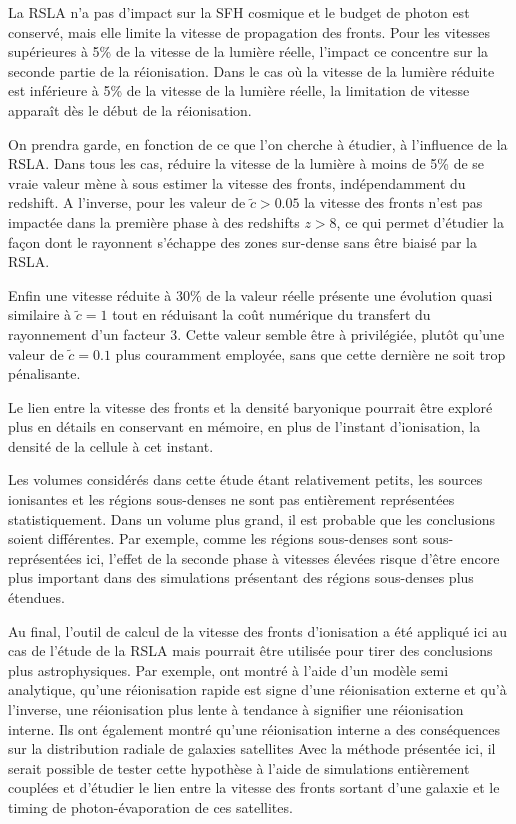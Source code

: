 La \ac{RSLA} n'a pas d'impact sur la \ac{SFH} cosmique et le budget de photon est conservé, mais elle limite la vitesse de propagation des fronts.
Pour les vitesses supérieures à 5\% de la vitesse de la lumière réelle, l'impact ce concentre sur la seconde partie de la réionisation.
Dans le cas où la vitesse de la lumière réduite est inférieure à 5\% de la vitesse de la lumière réelle, la limitation de vitesse apparaît dès le début de la réionisation. %

On prendra garde, en fonction de ce que l'on cherche à étudier, à l'influence de la \ac{RSLA}.
Dans tous les cas, réduire la vitesse de la lumière à moins de 5\% de se vraie valeur mène à sous estimer la vitesse des fronts, indépendamment du redshift.
A l'inverse, pour les valeur de $\tilde{c} > 0.05$ la vitesse des fronts n'est pas impactée dans la première phase à des redshifts $z>8$, ce qui permet d'étudier la façon dont le rayonnent s’échappe des zones sur-dense sans être biaisé par la \ac{RSLA}.

Enfin une vitesse réduite à 30\% de la valeur réelle présente une évolution quasi similaire à $\tilde{c}=1$ tout en réduisant la coût numérique du transfert du rayonnement d'un facteur 3.
Cette valeur semble être à privilégiée, plutôt qu'une valeur de $\tilde{c}=0.1$ plus couramment employée, sans que cette dernière ne soit trop pénalisante.

Le lien entre la vitesse des fronts et la densité baryonique pourrait être exploré plus en détails en conservant en mémoire, en plus de l'instant d'ionisation, la densité de la cellule à cet instant.

Les volumes considérés dans cette étude étant relativement petits, les sources ionisantes et les régions sous-denses ne sont pas entièrement représentées statistiquement.
Dans un volume plus grand, il est probable que les conclusions soient différentes.
Par exemple, comme les régions sous-denses sont sous-représentées ici, l'effet de la seconde phase à vitesses élevées risque d'être encore plus important dans des simulations présentant des régions sous-denses plus étendues.

Au final, l'outil de calcul de la vitesse des fronts d'ionisation a été appliqué ici au cas de l'étude de la \ac{RSLA} mais pourrait être utilisée pour tirer des conclusions plus astrophysiques.
Par exemple, \citep{2011MNRAS.417L..93O} ont montré à l'aide d'un modèle semi analytique, qu'une réionisation rapide est signe d'une réionisation externe et qu'à l'inverse, une réionisation plus lente à tendance à signifier une réionisation interne.
Ils ont également montré qu'une réionisation interne a des conséquences sur la distribution radiale de galaxies satellites 
Avec la méthode présentée ici, il serait possible de tester cette hypothèse à l'aide de simulations entièrement couplées et d'étudier le lien entre la vitesse des fronts sortant d'une galaxie et le timing de photon-évaporation de ces satellites.

